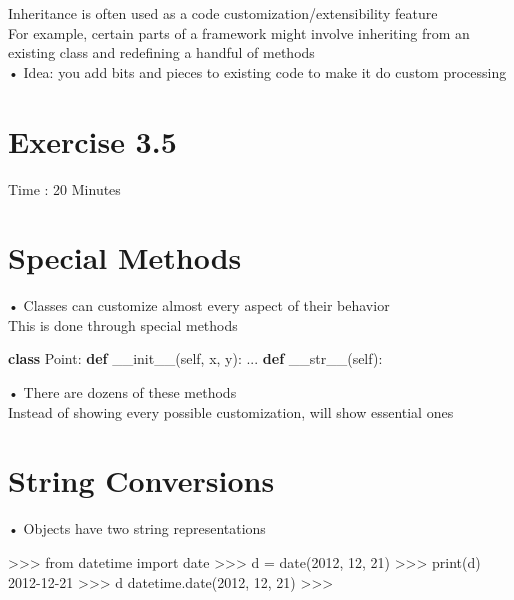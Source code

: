 \documentclass[
  letterpaper,
  DIV=11,
  numbers=noendperiod]{scrreprt}
\newenvironment{Shaded}{\begin{snugshade}}{\end{snugshade}}
\newcommand{\FunctionTok}[1]{\textcolor[rgb]{0.28,0.35,0.67}{#1}}
\newcommand{\KeywordTok}[1]{\textcolor[rgb]{0.00,0.23,0.31}{\textbf{#1}}}
\newcommand{\NormalTok}[1]{\textcolor[rgb]{0.00,0.23,0.31}{#1}}
\newcommand{\VariableTok}[1]{\textcolor[rgb]{0.07,0.07,0.07}{#1}}
\begin{document}
Inheritance is often used as a code customization/extensibility
feature\\
For example, certain parts of a framework might involve inheriting from
an existing class and redefining a handful of methods\\
• Idea: you add bits and pieces to existing code to make it do custom
processing


\chapter{Exercise 3.5}\label{exercise-3.5}

Time : 20 Minutes


\chapter{Special Methods}\label{special-methods}

• Classes can customize almost every aspect of their behavior\\
This is done through special methods

\begin{Shaded}
\begin{Highlighting}[]
\KeywordTok{class}\NormalTok{ Point: }\KeywordTok{def} \FunctionTok{\_\_init\_\_}\NormalTok{(}\VariableTok{self}\NormalTok{, x, y): ... }\KeywordTok{def} \FunctionTok{\_\_str\_\_}\NormalTok{(}\VariableTok{self}\NormalTok{): }
\end{Highlighting}
\end{Shaded}

• There are dozens of these methods\\
Instead of showing every possible customization, will show essential
ones


\chapter{String Conversions}\label{string-conversions}

• Objects have two string representations

\begin{Shaded}
\begin{Highlighting}[]
\NormalTok{\textgreater{}\textgreater{}\textgreater{} from datetime import date  }
\NormalTok{\textgreater{}\textgreater{}\textgreater{} d = date(2012, 12, 21)  }
\NormalTok{\textgreater{}\textgreater{}\textgreater{} print(d)  }
\NormalTok{2012{-}12{-}21  }
\NormalTok{\textgreater{}\textgreater{}\textgreater{} d  }
\NormalTok{datetime.date(2012, 12, 21)  }
\NormalTok{\textgreater{}\textgreater{}\textgreater{} }
\end{Highlighting}
\end{Shaded}
\end{document}
